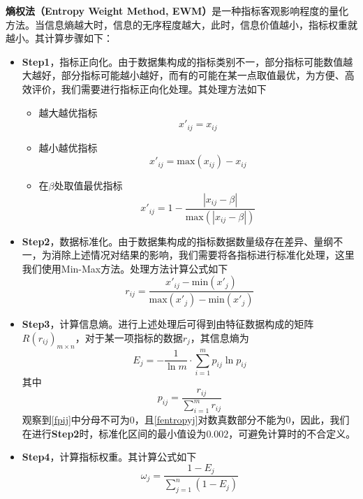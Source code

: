 \documentclass{MathorCupModeling}
\begin{document}
	\textbf{熵权法（Entropy Weight Method, EWM）}是一种指标客观影响程度的量化方法。当信息熵越大时，信息的无序程度越大，此时，信息价值越小，指标权重就越小\textcolor{blue}{\cite{pewm1}}。其计算步骤如下：
	\begin{itemize}
		\item \textbf{Step1}，指标正向化。由于数据集构成的指标类别不一，部分指标可能数值越大越好，部分指标可能越小越好，而有的可能在某一点取值最优，为方便、高效评价，我们需要进行指标正向化处理\textcolor{blue}{\cite{pewm2}}。其处理方法如下
		\begin{itemize}
			\item {\heiti 越大越优指标}
			\begin{equation}
				x'_{ij}=x_{ij} \label{fmax}
			\end{equation}
			\item {\heiti 越小越优指标}
			\begin{equation}
				x'_{ij}=\mathrm{max}\left(x_{ij}\right)-x_{ij} \label{fmin}
			\end{equation}
			\item {\heiti 在$\beta$处取值最优指标}
			\begin{equation}
				x'_{ij}=1-\frac{\left|x_{ij}-\beta\right|}{\mathrm{max}\left(\left|x_{ij}-\beta\right|\right)} \label{fmid}
			\end{equation}
		\end{itemize}
		\item \textbf{Step2}，数据标准化。由于数据集构成的指标数据数量级存在差异、量纲不一，为消除上述情况对结果的影响，我们需要将各指标进行标准化处理，这里我们使用Min-Max方法。处理方法计算公式如下
		\begin{equation}
			r_{ij}=\frac{x'_{ij}-\mathrm{min}\left(x'_{j}\right)}{\mathrm{max}\left(x'_{j}\right)-\mathrm{min}\left(x'_{j}\right)} \label{Min-Max}
		\end{equation}
		\item \textbf{Step3}，计算信息熵。进行上述处理后可得到由特征数据构成的矩阵$R\left(r_{ij}\right)_{m\times n}$，对于某一项指标的数据$r_j$，其信息熵为
		\begin{equation}
			E_j=-\frac{1}{\ln m}\cdot\sum\limits_{i=1}^{m}p_{ij}\ln p_{ij} \label{fentropyj}
		\end{equation}
		其中
		\begin{equation}
			p_{ij}=\frac{r_{ij}}{\sum\limits_{i=1}^{m}r_{ij}} \label{fpij}
		\end{equation}
		观察到\textcolor{blue}{\eqref{fpij}}中分母不可为$0$，且\textcolor{blue}{\eqref{fentropyj}}对数真数部分不能为$0$，因此，我们在进行\textbf{Step2}时，标准化区间的最小值设为$0.002$，可避免计算时的不合定义。
		\item \textbf{Step4}，计算指标权重。其计算公式如下
		\begin{equation}
			\omega_j=\frac{1-E_j}{\sum\limits_{j=1}^{n}\left(1-E_j\right)} \label{fwj}
		\end{equation}
	\end{itemize}
\end{document}
